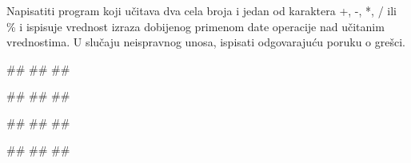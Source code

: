 \begin{Exercise}[label=KT_NG_25] 
Napisatiti program koji učitava dva cela broja i jedan od karaktera +, -, *, / ili \% i ispisuje vrednost izraza 
dobijenog primenom date operacije nad učitanim vrednostima.
U slučaju neispravnog unosa, ispisati odgovarajuću poruku o grešci. 

\begin{miditest}
\begin{upotreba}{1}
#\naslovInt#
##
##
\end{upotreba}
\end{miditest}
\begin{miditest}
\begin{upotreba}{2}
#\naslovInt#
##
##
\end{upotreba}
\end{miditest}

\begin{miditest}
\begin{upotreba}{3}
#\naslovInt#
##
##
\end{upotreba}
\end{miditest}
\begin{miditest}
\begin{upotreba}{4}
#\naslovInt#
##
##
\end{upotreba}
\end{miditest}

\end{Exercise}
\ifresenja
 \begin{Answer}[ref=KT_NG_25]
\end{Answer}
\fi


